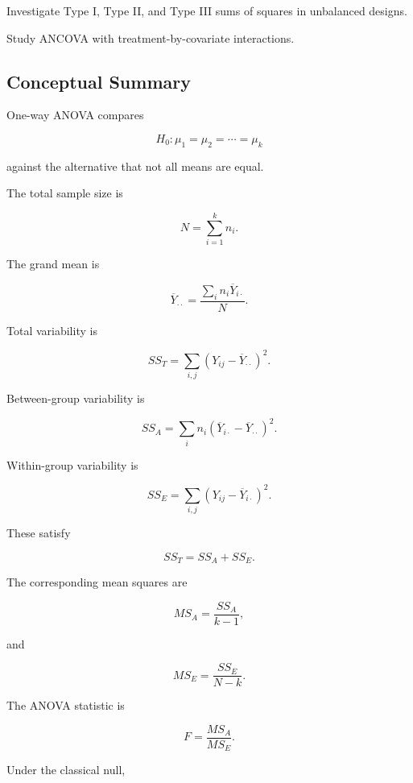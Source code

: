 \begin{exercise}[4]
Investigate Type I, Type II, and Type III sums of squares in unbalanced
designs.
\end{exercise}

\begin{exercise}[4]
Study ANCOVA with treatment-by-covariate interactions.
\end{exercise}

\subsection{Conceptual Summary}
\label{subsec:anova-summary}

One-way ANOVA compares

\[
\boxed{
H_0:
\mu_1
=
\mu_2
=
\cdots
=
\mu_k
}
\]

against the alternative that not all means are equal.

The total sample size is

\[
\boxed{
N
=
\sum_{i=1}^{k}
n_i.
}
\]

The grand mean is

\[
\boxed{
\overline{Y}_{\cdot\cdot}
=
\frac{
\sum_i
n_i\overline{Y}_{i\cdot}
}{
N
}.
}
\]

Total variability is

\[
\boxed{
SS_T
=
\sum_{i,j}
\left(
Y_{ij}
-
\overline{Y}_{\cdot\cdot}
\right)^2.
}
\]

Between-group variability is

\[
\boxed{
SS_A
=
\sum_i
n_i
\left(
\overline{Y}_{i\cdot}
-
\overline{Y}_{\cdot\cdot}
\right)^2.
}
\]

Within-group variability is

\[
\boxed{
SS_E
=
\sum_{i,j}
\left(
Y_{ij}
-
\overline{Y}_{i\cdot}
\right)^2.
}
\]

These satisfy

\[
\boxed{
SS_T
=
SS_A
+
SS_E.
}
\]

The corresponding mean squares are

\[
\boxed{
MS_A
=
\frac{
SS_A
}{
k-1
},
}
\]

and

\[
\boxed{
MS_E
=
\frac{
SS_E
}{
N-k
}.
}
\]

The ANOVA statistic is

\[
\boxed{
F
=
\frac{
MS_A
}{
MS_E
}.
}
\]

Under the classical null,

